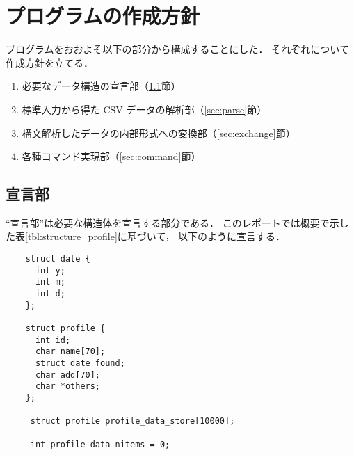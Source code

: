 \documentclass[a4j,11pt]{jarticle}
\begin{document}
\section{プログラムの作成方針}\label{sec:housin}


プログラムをおおよそ以下の部分から構成することにした．
それぞれについて作成方針を立てる．

\begin{enumerate}
\setlength{\parskip}{2pt} \setlength{\itemsep}{2pt}
    \item 必要なデータ構造の宣言部（\ref{sec:declare}節）
    \item 標準入力から得た CSV データの解析部（\ref{sec:parse}節）
    \item 構文解析したデータの内部形式への変換部（\ref{sec:exchange}節）
    \item 各種コマンド実現部（\ref{sec:command}節）
\end{enumerate}


\subsection{宣言部} 
\label{sec:declare}

``宣言部''は必要な構造体を宣言する部分である．
このレポートでは概要で示した表\ref{tbl:structure_profile}に基づいて，
以下のように宣言する．

{\fontsize{10pt}{11pt} \selectfont
\begin{verbatim}
    struct date {
      int y;
      int m;
      int d;
    };

    struct profile {
      int id;
      char name[70];
      struct date found;
      char add[70];
      char *others;
    };

     struct profile profile_data_store[10000];

     int profile_data_nitems = 0;

\end{verbatim}
}
\end{document}
